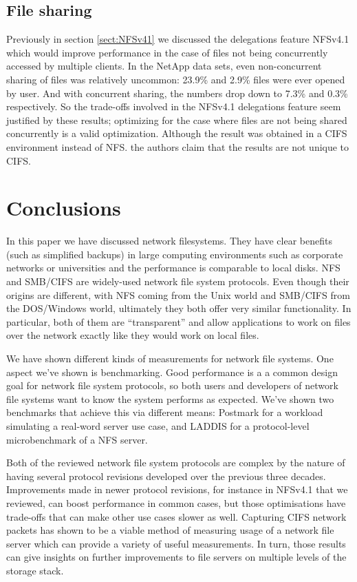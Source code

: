 \subsection{File sharing}

Previously in section \ref{sect:NFSv41} we discussed the delegations feature NFSv4.1 which would improve performance in the case of files not being concurrently accessed by multiple clients.
In the NetApp data sets, even non-concurrent sharing of files was relatively uncommon: 23.9\% and 2.9\% files were ever opened by user.
And with concurrent sharing, the numbers drop down to 7.3\% and 0.3\% respectively.
So the trade-offs involved in the NFSv4.1 delegations feature seem justified by these results;
optimizing for the case where files are not being shared concurrently is a valid optimization.
Although the result was obtained in a CIFS environment instead of NFS.
the authors claim that the results are not unique to CIFS.

\section{Conclusions}
In this paper we have discussed network filesystems.
They have clear benefits (such as simplified backups) in large computing environments such as corporate networks or universities
and the performance is comparable to local disks.
NFS and SMB/CIFS are widely-used network file system protocols.
Even though their origins are different, with NFS coming from the Unix world
and SMB/CIFS from the DOS/Windows world, ultimately they both offer very similar functionality.
In particular, both of them are ``transparent'' and allow applications to work on files over the network
exactly like they would work on local files.

We have shown different kinds of measurements for network file systems.
One aspect we've shown is benchmarking.
Good performance is a a common design goal for network file system protocols,
so both users and developers of network file systems want to know the system performs as expected.
We've shown two benchmarks that achieve this via different means:
Postmark for a workload simulating a real-word server use case,
and LADDIS for a protocol-level microbenchmark of a NFS server.

Both of the reviewed network file system protocols are complex by the nature of having several protocol revisions developed over the previous three decades.
Improvements made in newer protocol revisions, for instance in NFSv4.1 that we reviewed, can boost performance in common cases,
but those optimisations have trade-offs that can make other use cases slower as well.
Capturing CIFS network packets has shown to be a viable method of measuring usage of a network file server which can provide a variety of useful measurements.
In turn, those results can give insights on further improvements to file servers on multiple levels of the storage stack.
